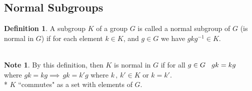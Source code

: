 \documentclass[11pt,a4paper]{article}
\theoremstyle{definition}
\newtheorem{defn}[thm]{Definition}
\newtheorem*{note}{Note}
\begin{document}
\vspace{1cm}
\subsection{Normal Subgroups}

\begin{defn}
A subgroup $K$ of a group $G$ is called a normal subgroup of $G$ (is normal in $G$) if for each element $k\in K$, and $g\in G$ we have $gkg^{-1}\in K$.\\\\
\end{defn}




\begin{note}
By this definition, then $K$ is normal in $G$ if for all $g\in G\hspace{0.3cm} gk = kg$ where $gk = kg \implies \, gk = k'g$ where $k\, , \, k'\in K$ or $k = k'$.\\
* $K$ ``commutes" as a set with elements of $G$.\\\\
\end{note}
\end{document}
